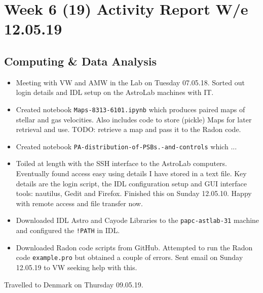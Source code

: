 \section{Week 6 (19) Activity Report W/e 12.05.19}

\subsection{Computing \& Data Analysis}
\begin{itemize}
    \item Meeting with VW and AMW in the Lab on Tuesday 07.05.18. Sorted out login details and IDL setup on the AstroLab machines with IT.
    \item Created notebook \texttt{Maps-8313-6101.ipynb} which produces paired maps of stellar and gas velocities. Also includes code to store (pickle) Maps for later retrieval and use. TODO: retrieve a map and pass it to the Radon code.
    \item Created notebook \texttt{PA-distribution-of-PSBs.-and-controls} which ...
    \item Toiled at length with the SSH interface to the AstroLab computers. Eventually found access easy using details I have stored in a text file. Key details are the login script, the IDL configuration setup and GUI interface tools: nautilus, Gedit and Firefox. Finished this on Sunday 12.05.10. Happy with remote access and file transfer now.
    \item Downloaded IDL Astro and Cayode Libraries to the \texttt{papc-astlab-31} machine and configured the \texttt{!PATH} in IDL.
    \item Downloaded Radon code scripts from GitHub. Attempted to run the Radon code \texttt{example.pro} but obtained a couple of errors. Sent email on Sunday 12.05.19 to VW seeking help with this. 
    
\end{itemize}

Travelled to Denmark on Thursday 09.05.19.
